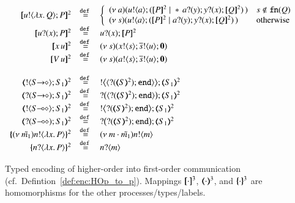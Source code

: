 \begin{figure}[t]
	\[
	\begin{array}{rcl}
		\pmap{\bout{u}{\abs{x}{Q}} P}{2} & \defeq &  \left\{
		\begin{array}{ll}
			\newsp{a}{\bout{u}{a} (\pmap{P}{2} \Par \repl{} \binp{a}{y} \binp{y}{x} \pmap{Q}{2})\,} & s \notin \fn{Q} \\
			\newsp{s}{\bout{u}{a} (\pmap{P}{2} \Par \binp{a}{y} \binp{y}{x} \pmap{Q}{2})\,} & \textrm{otherwise} %
		\end{array}
		\right.
		\\
		\pmap{\binp{u}{x} P}{2} &\defeq&  \binp{u}{x} \pmap{P}{2}
		\\
		\pmap{\appl{x}{u}}{2} & \defeq & \newsp{s}{\bout{x}{s} \bout{\dual{s}}{u} \inact}
		\\
		\pmap{\appl{V}{u}}{2} & \defeq & \newsp{s}{\bout{a}{s} \bout{\dual{s}}{u} \inact}
		\\
		\\
		\tmap{\btout{\shot{S}}S_1}{2} & \defeq & \bbtout{\chtype{\btinp{\tmap{S}{2}}\tinact}}\tmap{S_1}{2} \\
		\tmap{\btinp{\shot{S}}S_1}{2} & \defeq & \bbtinp{\chtype{\btinp{\tmap{S}{2}}\tinact}}\tmap{S_1}{2} \\

		\tmap{\btout{\lhot{S}}S_1}{2} & \defeq & \bbtout{\btinp{\tmap{S}{2}}\tinact}\tmap{S_1}{2} \\
		\tmap{\btinp{\lhot{S}}S_1}{2} & \defeq & \bbtinp{\btinp{\tmap{S}{2}}\tinact}\tmap{S_1}{2} \\
		\mapa{\news{\tilde{m_1}}\bactout{n}{\abs{ x}{P}} }^{2} &  \defeq & \news{m \cdot \tilde{m_1}} \bactout{n}{m} \\
		\mapa{\bactinp{n}{\abs{ x}{P}} }^{2} &  \defeq & \bactinp{n}{m}
	\end{array}
	\]
	\caption{
		Typed encoding of higher-order  into first-order communication (cf.~Defintion~\ref{def:enc:HOp_to_p}).
		\label{fig:enc:HOp_to_p}
		Mappings 
		$[\!\![\cdot]\!\!]^3$,
		$(\!\!\langle\cdot\rangle\!\!)^3$, 
		and 
		$\{\!\!\{\cdot\}\!\!\}^3$
		are homomorphisms for the other processes/types/labels. 
	}
\end{figure}

